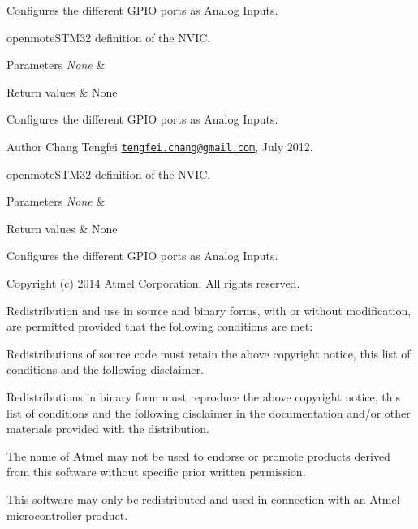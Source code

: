 Configures the different G\+P\+IO ports as Analog Inputs. 

openmote\+S\+T\+M32 definition of the N\+V\+IC.


\begin{DoxyParams}{Parameters}
{\em None} & \\
\hline
\end{DoxyParams}

\begin{DoxyRetVals}{Return values}
{\em } & None\\
\hline
\end{DoxyRetVals}
Configures the different G\+P\+IO ports as Analog Inputs.

\begin{DoxyAuthor}{Author}
Chang Tengfei \href{mailto:tengfei.chang@gmail.com}{\tt tengfei.\+chang@gmail.\+com}, July 2012.
\end{DoxyAuthor}
openmote\+S\+T\+M32 definition of the N\+V\+IC.


\begin{DoxyParams}{Parameters}
{\em None} & \\
\hline
\end{DoxyParams}

\begin{DoxyRetVals}{Return values}
{\em } & None\\
\hline
\end{DoxyRetVals}
Configures the different G\+P\+IO ports as Analog Inputs.

Copyright (c) 2014 Atmel Corporation. All rights reserved.

Redistribution and use in source and binary forms, with or without modification, are permitted provided that the following conditions are met\+:


\begin{DoxyEnumerate}
\item Redistributions of source code must retain the above copyright notice, this list of conditions and the following disclaimer.
\item Redistributions in binary form must reproduce the above copyright notice, this list of conditions and the following disclaimer in the documentation and/or other materials provided with the distribution.
\item The name of Atmel may not be used to endorse or promote products derived from this software without specific prior written permission.
\item This software may only be redistributed and used in connection with an Atmel microcontroller product.
\end{DoxyEnumerate}


